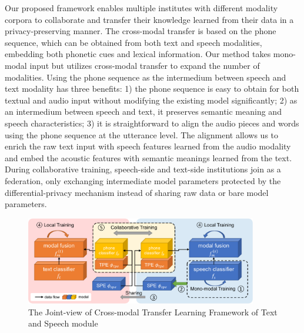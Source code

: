 \documentclass[11pt]{article}
\begin{document}
Our proposed framework enables multiple institutes with different modality corpora to collaborate and transfer their knowledge learned from their data in a privacy-preserving manner. The cross-modal transfer is based on the phone sequence, which can be obtained from both text and speech modalities, embedding both phonetic cues and lexical information. Our method takes mono-modal input but utilizes cross-modal transfer to expand the number of modalities. Using the phone sequence as the intermedium between speech and text modality has three benefits: 1) the phone sequence is easy to obtain for both textual and audio input without modifying the existing model significantly; 2) as an intermedium between speech and text, it preserves semantic meaning and speech characteristics; 3) it is straightforward to align the audio pieces and words using the phone sequence at the utterance level. The alignment allows us to enrich the raw text input with speech features learned from the audio modality and embed the acoustic features with semantic meanings learned from the text. During collaborative training, speech-side and text-side institutions join as a federation, only exchanging intermediate model parameters protected by the differential-privacy mechanism instead of sharing raw data or bare model parameters.

\begin{figure}[!htp]
    \centering
    \includegraphics[width=0.9\textwidth, trim={5 5 5 5},clip]{framework.pdf}
    \caption{The Joint-view of Cross-modal Transfer Learning Framework of Text and Speech module}
    \label{fig:fct}
    \medskip %

\end{figure} 
\end{document}
